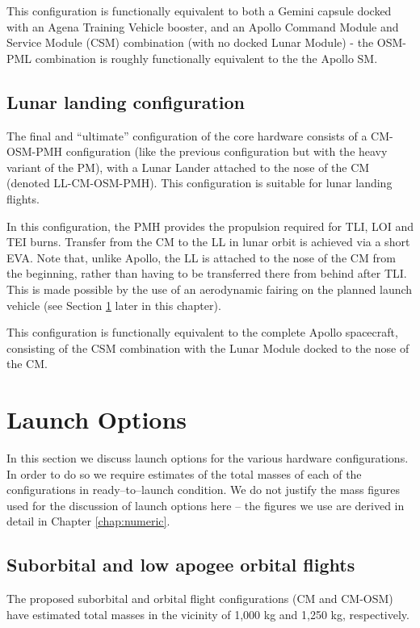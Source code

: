 \documentclass{report}
\begin{document}
This configuration is functionally equivalent to both a Gemini capsule docked with an Agena Training Vehicle booster, and an Apollo Command Module and Service Module (CSM) combination (with no docked Lunar Module) - the OSM-PML combination is roughly functionally equivalent to the the Apollo SM.

\subsection{Lunar landing configuration}

The final and ``ultimate'' configuration of the core hardware consists of a CM-OSM-PMH configuration (like the previous configuration but with the heavy variant of the PM), with a Lunar Lander attached to the nose of the CM (denoted LL-CM-OSM-PMH).  This configuration is suitable for lunar landing flights.

In this configuration, the PMH provides the propulsion required for TLI, LOI and TEI burns.  Transfer from the CM to the LL in lunar orbit is achieved via a short EVA.  Note that, unlike Apollo, the LL is attached to the nose of the CM from the beginning, rather than having to be transferred there from behind after TLI.  This is made possible by the use of an aerodynamic fairing on the planned launch vehicle (see Section \ref{sec:launchopt} later in this chapter).

This configuration is functionally equivalent to the complete Apollo spacecraft, consisting of the CSM combination with the Lunar Module docked to the nose of the CM.

\section{Launch Options} \label{sec:launchopt}

In this section we discuss launch options for the various hardware configurations.  In order to do so we require estimates of the total masses of each of the configurations in ready--to--launch condition.  We do not justify the mass figures used for the discussion of launch options here -- the figures we use are derived in detail in Chapter \ref{chap:numeric}.

\subsection{Suborbital and low apogee orbital flights}

The proposed suborbital and orbital flight configurations (CM and CM-OSM) have estimated total masses in the vicinity of 1,000 kg and 1,250 kg, respectively.
\end{document}
